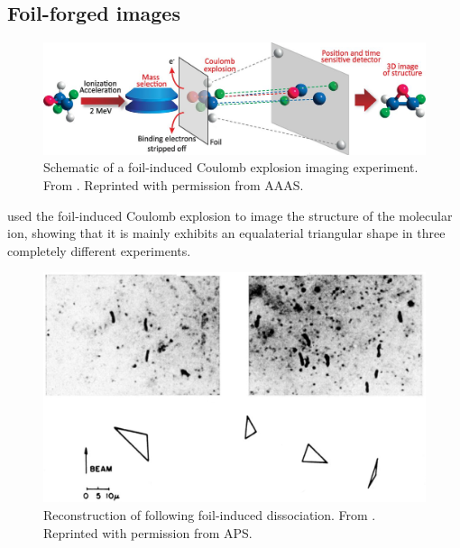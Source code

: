 
\subsection{Foil-forged images}


\begin{figure}
  \centering
  \includegraphics[width=\textwidth]{gfx/FoilExperiment}
  \caption[Schematic of a foil-induced Coulomb explosion imaging experiment.]
  {Schematic of a foil-induced Coulomb explosion imaging experiment. From \citet{Herwig13}. Reprinted with permission from AAAS.}
\end{figure}

\citet{Gaillard78} used the foil-induced Coulomb explosion to image the structure of the  molecular ion, showing that it is mainly exhibits an equalaterial triangular shape in three completely different experiments\footnotemark.


\begin{figure}
  \centering
  \includegraphics[width=\textwidth]{gfx/HydrogenTrimerReconstruction}
  \caption[Reconstruction of  following foil-induced dissociation.]
  {Reconstruction of  following foil-induced dissociation. From \citet{Gaillard78}. Reprinted with permission from APS.}
\end{figure}

